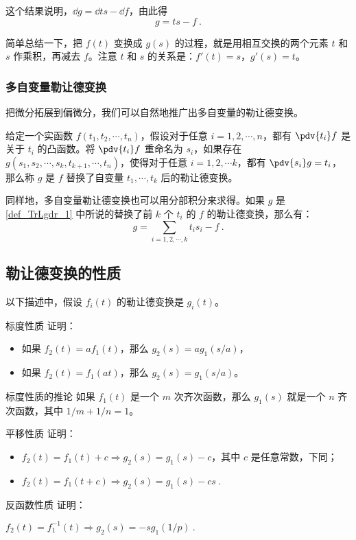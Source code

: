这个结果说明，$\dd{g}=\dd{ts}-\dd{f}$，由此得
\begin{equation}
g=ts-f~.
\end{equation}

简单总结一下，把 $f(t)$ 变换成 $g(s)$ 的过程，就是用相互交换的两个元素 $t$ 和 $s$ 作乘积，再减去 $f$。注意 $t$ 和 $s$ 的关系是：$f'(t)=s$，$g'(s)=t$。

\subsubsection{多自变量勒让德变换}

把微分拓展到偏微分，我们可以自然地推广出多自变量的勒让德变换。

\begin{definition}{}\label{def_TrLgdr_1}
给定一个实函数 $f(t_1, t_2, \cdots, t_n)$，假设对于任意 $i=1, 2, \cdots, n$，都有 $\pdv{t_i}f$ 是关于 $t_i$ 的凸函数。将 $\pdv{t_i}f$ 重命名为 $s_i$，如果存在 $g(s_1, s_2, \cdots, s_k, t_{k+1},\cdots, t_n)$，使得对于任意 $i=1,2,\cdots k$，都有 $\pdv{s_i}g=t_i$，那么称 $g$ 是 $f$ 替换了自变量 $t_1, \cdots, t_k$ 后的勒让德变换。
\end{definition}

同样地，多自变量勒让德变换也可以用分部积分来求得。如果 $g$ 是\autoref{def_TrLgdr_1} 中所说的替换了前 $k$ 个 $t_i$ 的 $f$ 的勒让德变换，那么有：\begin{equation}\label{eq_TrLgdr_1}
g=\sum\limits_{i=1,2,\cdots, k}t_is_i-f~.
\end{equation}

\subsection{勒让德变换的性质}

以下描述中，假设 $f_i(t)$ 的勒让德变换是 $g_i(t)$。

\begin{exercise}{标度性质}
证明：
\begin{itemize}
\item 如果 $f_2(t)=af_1(t)$，那么 $g_2(s)=ag_1(s/a)$，
\item 如果 $f_2(t)=f_1(at)$，那么 $g_2(s)=g_1(s/a)$。
\end{itemize}
\end{exercise}

\begin{corollary}{标度性质的推论}
如果 $f_1(t)$ 是一个 $m$ 次齐次函数，那么 $g_1(s)$ 就是一个 $n$ 齐次函数，其中 $1/m+1/n=1$。
\end{corollary}

\begin{exercise}{平移性质}
证明：
\begin{itemize}
\item $f_2(t)=f_1(t)+c\Rightarrow g_2(s)=g_1(s)-c$，其中 $c$ 是任意常数，下同；
\item $f_2(t)=f_1(t+c)\Rightarrow g_2(s)=g_1(s)-cs~.$
\end{itemize}
\end{exercise}

\begin{exercise}{反函数性质}
证明：

$f_2(t)=f_1^{-1}(t)\Rightarrow g_2(s)=-sg_1(1/p)~.$
\end{exercise}








